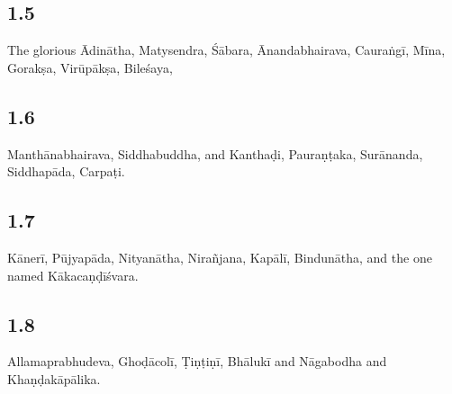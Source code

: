 \begin{ekdosis}

\subsection*{1.5}
\begin{translation}[hp01_005]
The glorious Ādinātha, Matysendra, Śābara, Ānandabhairava, Cauraṅgī, Mīna, Gorakṣa, Virūpākṣa, Bileśaya,
\end{translation}


\subsection*{1.6}
\begin{translation}[hp01_006]
Manthānabhairava, Siddhabuddha, and Kanthaḍi, Pauraṇṭaka, Surānanda, Siddhapāda, Carpaṭi.
\end{translation}


\subsection*{1.7}
\begin{translation}[hp01_007]
Kānerī, Pūjyapāda, Nityanātha, Nirañjana, Kapālī, Bindunātha, and the one named Kākacaṇḍīśvara.
\end{translation}


\subsection*{1.8}
\begin{translation}[hp01_008]
Allamaprabhudeva, Ghoḍācolī, Ṭiṇṭiṇī, Bhālukī and Nāgabodha and Khaṇḍakāpālika.
\end{translation}



\end{ekdosis}
